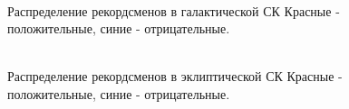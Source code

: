 \documentclass[12pt,aspectratio=43]{beamer}
\begin{document}
\begin{frame}[<alignment>]
\begin{figure}[h!]
\\{Распределение рекордсменов в галактической СК Красные - положительные, синие - отрицательные.}
\label{img:75maxlb}
\end{figure}
\end{frame}

\begin{frame}[<alignment>]
\begin{figure}[h!]
\\{Распределение рекордсменов в эклиптической СК Красные - положительные, синие - отрицательные.}
\label{img:75maxlonlat}
\end{figure}
\end{frame}	
\end{document}
